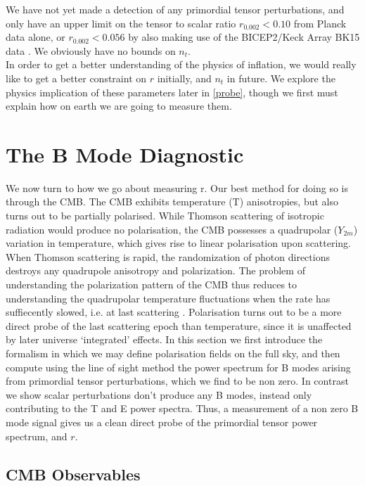 \documentclass[a4paper,10pt]{article}
\begin{document}
We have not yet made a detection of any primordial tensor perturbations, and only have an upper limit on the tensor to scalar ratio $r_{0.002}<0.10$ from Planck data alone, or $r_{0.002}<0.056$ by also making use of the BICEP2/Keck Array BK15 data \cite{planck-inflation}. We obviously have no bounds on $n_t$.\\

In order to get a better understanding of the physics of inflation, we would really like to get a better constraint on $r$ initially, and $n_t$ in future. We explore the physics implication of these parameters later in \ref{probe}, though we first must explain how on earth we are going to measure them.

\newpage

\section{The B Mode Diagnostic}

We now turn to how we go about measuring r. Our best method for doing so is through the CMB. The CMB exhibits temperature (T) anisotropies, but also turns out to be partially polarised. While Thomson scattering of isotropic radiation would produce no polarisation, the CMB possesses a quadrupolar ($Y_{2m}$) variation in temperature, which gives rise to linear polarisation upon scattering. When Thomson scattering is rapid, the randomization of photon directions destroys any quadrupole anisotropy and polarization. The problem of understanding the polarization pattern of the CMB thus reduces to understanding the quadrupolar temperature fluctuations when the rate has suffiecently slowed, i.e. at last scattering \cite{hu}. Polarisation turns out to be a more direct probe of the last scattering epoch than temperature, since it is unaffected by later universe `integrated' effects. In this section we first introduce the formalism in which we may define polarisation fields on the full sky, and then compute using the line of sight method the power spectrum for B modes arising from primordial tensor perturbations, which we find to be non zero. In contrast we show scalar perturbations don't produce any B modes, instead only contributing to the T and E power spectra. Thus, a measurement of a non zero B mode signal gives us a clean direct probe of the primordial tensor power spectrum, and $r$. 

\subsection{CMB Observables}
\end{document}
